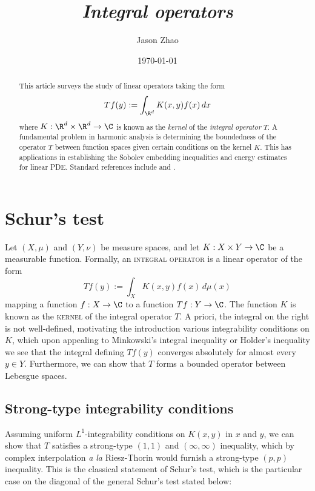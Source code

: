 \documentclass[reqno]{amsart}
\title
{
	\emph{Integral operators}
}
\author{Jason Zhao}
\date{\today}
\theoremstyle{definition}
\theoremstyle{remark}
\renewcommand{\emph}{\textsc}
\begin{document}
\maketitle

\begin{abstract}
	This article surveys the study of linear operators taking the form 
		\[ Tf(y) := \int_{\R^d} K(x, y) f(x) \, dx \]
	where $K : \R^d \times \R^d \to \C$ is known as the \textit{kernel} of the \textit{integral operator} $T$. A fundamental problem in harmonic analysis is determining the boundedness of the operator $T$ between function spaces given certain conditions on the kernel $K$. This has applications in establishing the Sobolev embedding inequalities and energy estimates for linear PDE. Standard references include \cite{Duoandikoetxea2001} and \cite{Stein1970}. 
\end{abstract}

\tableofcontents

\section{Schur's test}

Let $(X, \mu)$ and $(Y, \nu)$ be measure spaces, and let $K : X \times Y \to \C$ be a measurable function. Formally, an \emph{integral operator} is a linear operator of the form
	\[ Tf(y) := \int_X K(x, y) f(x) \, d\mu (x) \]
mapping a function $f: X \to \C$ to a function $Tf : Y \to \C$. The function $K$ is known as the \emph{kernel} of the integral operator $T$. A priori, the integral on the right is not well-defined, motivating the introduction various integrability conditions on $K$, which upon appealing to Minkowski's integral inequality or Holder's inequality we see that the integral defining $Tf(y)$ converges absolutely for almost every $y \in Y$. Furthermore, we can show that $T$ forms a bounded operator between Lebesgue spaces.

\subsection{Strong-type integrability conditions}

Assuming uniform $L^1$-integrability conditions on $K(x, y)$ in $x$ and $y$, we can show that $T$ satisfies a strong-type $(1, 1)$ and $(\infty, \infty)$ inequality, which by complex interpolation \textit{a la} Riesz-Thorin would furnish a strong-type $(p, p)$ inequality. This is the classical statement of Schur's test, which is the particular case on the diagonal of the general Schur's test stated below:
\end{document}
